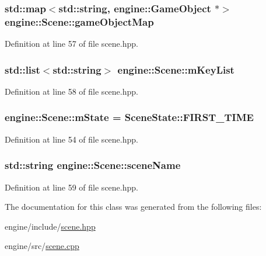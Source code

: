 \subsubsection[{\texorpdfstring{game\+Object\+Map}{gameObjectMap}}]{\setlength{\rightskip}{0pt plus 5cm}std\+::map$<$std\+::string, {\bf engine\+::\+Game\+Object} $\ast$$>$ engine\+::\+Scene\+::game\+Object\+Map\hspace{0.3cm}{\ttfamily [protected]}}\hypertarget{classengine_1_1_scene_a7b27b00796602fc52515114b17f06ea4}{}\label{classengine_1_1_scene_a7b27b00796602fc52515114b17f06ea4}


Definition at line 57 of file scene.\+hpp.

\subsubsection[{\texorpdfstring{m\+Key\+List}{mKeyList}}]{\setlength{\rightskip}{0pt plus 5cm}std\+::list$<$std\+::string$>$ engine\+::\+Scene\+::m\+Key\+List\hspace{0.3cm}{\ttfamily [protected]}}\hypertarget{classengine_1_1_scene_a1fff54180b377adb5d66dc75e6494d5e}{}\label{classengine_1_1_scene_a1fff54180b377adb5d66dc75e6494d5e}


Definition at line 58 of file scene.\+hpp.

\subsubsection[{\texorpdfstring{m\+State}{mState}}]{ engine\+::\+Scene\+::m\+State = {\bf Scene\+State\+::\+F\+I\+R\+S\+T\+\_\+\+T\+I\+ME}}\hypertarget{classengine_1_1_scene_a25912176ae12eab48035b7d218955466}{}\label{classengine_1_1_scene_a25912176ae12eab48035b7d218955466}


Definition at line 54 of file scene.\+hpp.

\subsubsection[{\texorpdfstring{scene\+Name}{sceneName}}]{\setlength{\rightskip}{0pt plus 5cm}std\+::string engine\+::\+Scene\+::scene\+Name\hspace{0.3cm}{\ttfamily [protected]}}\hypertarget{classengine_1_1_scene_a62943c09d12941bc32feab48e2d7d38a}{}\label{classengine_1_1_scene_a62943c09d12941bc32feab48e2d7d38a}


Definition at line 59 of file scene.\+hpp.



The documentation for this class was generated from the following files\+:\begin{DoxyCompactItemize}
\item 
engine/include/\hyperlink{scene_8hpp}{scene.\+hpp}\item 
engine/src/\hyperlink{scene_8cpp}{scene.\+cpp}\end{DoxyCompactItemize}
